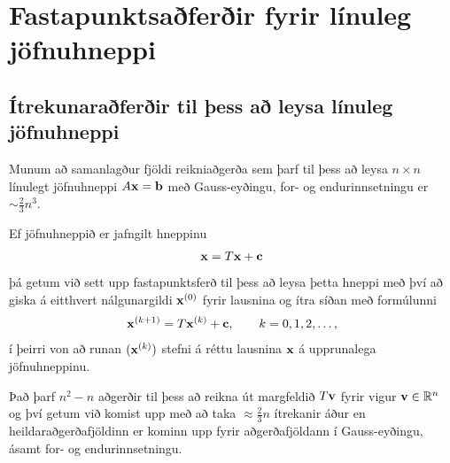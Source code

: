 \documentclass[letterpaper,10pt,icelandic]{sphinxmanual}
\begin{document}
\section{Fastapunktsaðferðir fyrir línuleg jöfnuhneppi}
\label{kafli08:index-20}\label{kafli08:fastapunktsaferir-fyrir-linuleg-jofnuhneppi}

\subsection{Ítrekunaraðferðir til þess að leysa línuleg jöfnuhneppi}
\label{kafli08:itrekunaraferir-til-ess-a-leysa-linuleg-jofnuhneppi}
Munum að samanlagður fjöldi reikniaðgerða sem þarf til þess að leysa
\(n\times n\) línulegt jöfnuhneppi
\(A\mbox{${\bf x}$}=\mbox{${\bf b}$}\) með Gauss-eyðingu, for- og
endurinnsetningu er \(\sim \tfrac 23 n^3\).

Ef jöfnuhneppið er jafngilt hneppinu
\begin{gather}
\begin{split}\mbox{${\bf x}$}=T\mbox{${\bf x}$}+\mbox{${\bf c}$}\end{split}\notag
\end{gather}
þá getum við sett upp fastapunktsferð til þess að leysa þetta hneppi með
því að giska á eitthvert nálgunargildi \(\mbox{${\bf x}$}^{(0)}\)
fyrir lausnina og ítra síðan með formúlunni
\begin{gather}
\begin{split}\mbox{${\bf x}$}^{(k+1)}=T\mbox{${\bf x}$}^{(k)}+\mbox{${\bf c}$}, \qquad k=0,1,2,\dots,\end{split}\notag
\end{gather}
í þeirri von að runan \((\mbox{${\bf x}$}^{(k)})\) stefni á réttu
lausnina \(\mbox{${\bf x}$}\) á upprunalega jöfnuhneppinu.

Það þarf \(n^2-n\) aðgerðir til þess að reikna út margfeldið
\(T\mbox{${\bf v}$}\) fyrir vigur
\(\mbox{${\bf v}$}\in {\mathbb  R}^n\) og því getum við komist upp
með að taka \(\approx \tfrac 23 n\) ítrekanir áður en
heildaraðgerðafjöldinn er kominn upp fyrir aðgerðafjöldann í
Gauss-eyðingu, ásamt for- og endurinnsetningu.
\end{document}
